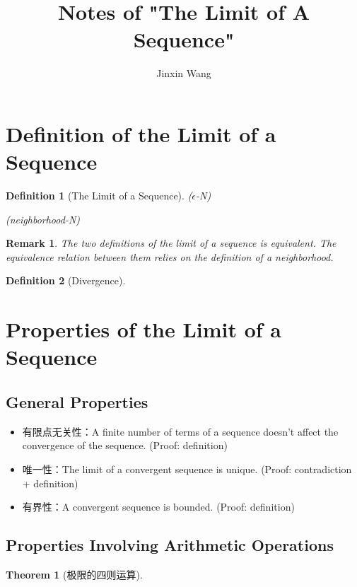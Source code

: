 \documentclass[onecolumn]{ctexart}
\title{Notes of "The Limit of A Sequence"}
\author{Jinxin Wang}
\date{}
\newtheorem{definition}{Definition}
\newtheorem{theorem}{Theorem}
\newtheorem{remark}{Remark}
\begin{document}
\maketitle

\section{Definition of the Limit of a Sequence}

\begin{definition}[The Limit of a Sequence]
  ($\epsilon$-N) 

  (neighborhood-N)
\end{definition}

\begin{remark}
  The two definitions of the limit of a sequence is equivalent. The equivalence 
  relation between them relies on the definition of a neighborhood.
\end{remark}

\begin{definition}[Divergence]
  
\end{definition}

\section{Properties of the Limit of a Sequence}

\subsection{General Properties}

\begin{itemize}
  \item 有限点无关性：A finite number of terms of a sequence doesn't affect the 
  convergence of the sequence. (Proof: definition)
  \item 唯一性：The limit of a convergent sequence is unique. (Proof: 
  contradiction + definition)
  \item 有界性：A convergent sequence is bounded. (Proof: definition)
\end{itemize}

\subsection{Properties Involving Arithmetic Operations}

\begin{theorem}[极限的四则运算]
  
\end{theorem}
\end{document}
